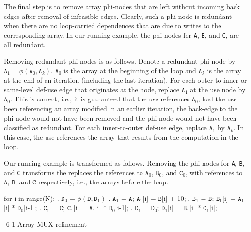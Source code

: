 \documentclass[sigconf, screen, natbib=false, dvipsnames, table]{acmart}
\makeatletter
\renewcommand{\subsubsection}{\@startsection{subsubsection}{3}{\z@}%
                        {-6\p@ \@plus -4\p@ \@minus -4\p@}%
                        {1\p@ \@plus 1\p@ \@minus 0\p@}%
                        {\normalfont\normalsize\bfseries\boldmath}}
\theoremstyle{definition}
\makeatother
\begin{document}

The final step is to remove array phi-nodes that are left without incoming back edges after removal of infeasible edges.
Clearly, such a phi-node is redundant when there are no loop-carried dependences that are due to writes to the corresponding array.
In our running example, the phi-nodes for \texttt{A}, \texttt{B}, and \texttt{C}, are all redundant.

Removing redundant phi-nodes is as follows.
Denote a redundant phi-node by $\texttt{A}_1 = \phi(\texttt{A}_0,\texttt{A}_k)$. $\texttt{A}_0$ is the array at the beginning of the loop
and $\texttt{A}_k$ is the array at the end of an iteration (including the last iteration). For each outer-to-inner or same-level def-use edge
that originates at the node, replace $\texttt{A}_1$ at the use node by $\texttt{A}_0$. This is correct, i.e., it is guaranteed that the use
references $\texttt{A}_0$; had the use been referencing an array modified in an earlier iteration, the back-edge to the phi-node would
not have been removed and the phi-node would not have been classified as redundant.
For each inner-to-outer def-use edge, replace $\texttt{A}_1$ by $\texttt{A}_k$. In this case, the use references the array
that results from the computation in the loop.

Our running example is transformed as follows. Removing the phi-nodes for \texttt{A}, \texttt{B}, and \texttt{C} transforms the
replaces the references to $\texttt{A}_0$, $\texttt{B}_0$, and $\texttt{C}_0$, with references to $\texttt{A}$, $\texttt{B}$, and $\texttt{C}$
respectively, i.e., the arrays before the loop.

\begin{algorithmic}
\STATE for i in range(N):
. $\texttt{D}_0$ = $\phi(\texttt{D},\texttt{D}_1)$
. $\texttt{A}_1$ = $\texttt{A}$; $\texttt{A}_1$[i] = $\texttt{B}$[i] + 10;
. $\texttt{B}_1$ = $\texttt{B}$; $\texttt{B}_1$[i] = $\texttt{A}_1$[i] * $\texttt{D}_0$[i-1];
. $\texttt{C}_1$ = $\texttt{C}$; $\texttt{C}_1$[i] = $\texttt{A}_1$[i] * $\texttt{D}_0$[i-1];
. $\texttt{D}_1$ = $\texttt{D}_0$; $\texttt{D}_1$[i] = $\texttt{B}_1$[i] * $\texttt{C}_1$[i];
\end{algorithmic}

\subsubsection{Array MUX refinement}
\end{document}
